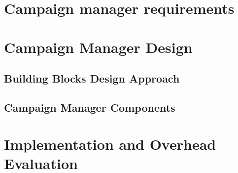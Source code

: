 \label{ch:cmanager}

\section{Campaign manager requirements}
\section{Campaign Manager Design}
\subsection{Building Blocks Design Approach}
\subsection{Campaign Manager Components}
\section{Implementation and Overhead Evaluation}
